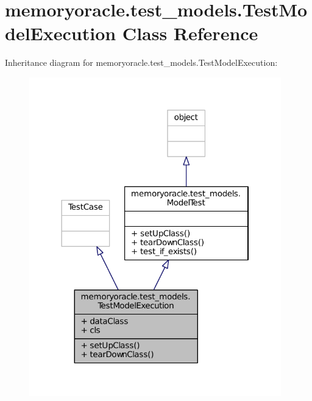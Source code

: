 \hypertarget{classmemoryoracle_1_1test__models_1_1TestModelExecution}{}\section{memoryoracle.\+test\+\_\+models.\+Test\+Model\+Execution Class Reference}
\label{classmemoryoracle_1_1test__models_1_1TestModelExecution}


Inheritance diagram for memoryoracle.\+test\+\_\+models.\+Test\+Model\+Execution\+:\nopagebreak
\begin{figure}[H]
\begin{center}
\leavevmode
\includegraphics[width=310pt]{classmemoryoracle_1_1test__models_1_1TestModelExecution__inherit__graph}
\end{center}
\end{figure}


